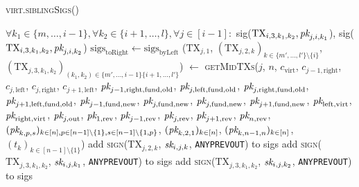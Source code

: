 \begin{center}
\begin{processbox}{\textsc{virt.siblingSigs}()}
\begin{algorithmic}[1]
      \Indent
        \State $\forall k_1 \in \{m, \dots, i-1\}, \forall k_2 \in \{i+1, \dots,
        l\}, \forall j \in [i-1]:$
        \Indent
          \State sig($\mathrm{TX}_{i, 3, k_1, k_2}, \textit{pk}_{j, i, k_1}$),
          sig($\mathrm{TX}_{i, 3, k_1, k_2}, \textit{pk}_{j, i, k_2}$)
        \EndIndent
      \EndIndent
      \State $\mathrm{sigs}_{\mathrm{toRight}} \gets
      \mathrm{sigs}_{\mathrm{byLeft}}$
      \Statex
        \State ($\mathrm{TX}_{j, 1}$, $(\mathrm{TX}_{j, 2, k})_{k \in \{m',
        \dots, l'\} \setminus \{i\}}$, $(\mathrm{TX}_{j, 3, k_1, k_2})_{(k_1,
        k_2) \in \{m', \dots, i-1\} \{i+1, \dots, l'\}}$) $\gets$
        \textsc{getMidTXs}($j$, $n$, $c_{\mathrm{virt}}$, $c_{j-1,
        \mathrm{right}}$, $c_{j, \mathrm{left}}$, $c_{j, \mathrm{right}}$,
        $c_{j+1, \mathrm{left}}$, $\textit{pk}_{j-1, \mathrm{right}, \mathrm{fund},
        \mathrm{old}}$, $\textit{pk}_{j, \mathrm{left}, \mathrm{fund}, \mathrm{old}}$,
        $\textit{pk}_{j, \mathrm{right}, \mathrm{fund}, \mathrm{old}}$, $\textit{pk}_{j+1,
        \mathrm{left}, \mathrm{fund}, \mathrm{old}}$, $\textit{pk}_{j-1, \mathrm{fund},
        \mathrm{new}}$, $\textit{pk}_{j, \mathrm{fund}, \mathrm{new}}$, $\textit{pk}_{j,
        \mathrm{fund}, \mathrm{new}}$, $\textit{pk}_{j+1, \mathrm{fund}, \mathrm{new}}$,
        $\textit{pk}_{\mathrm{left}, \mathrm{virt}}$, $\textit{pk}_{\mathrm{right},
        \mathrm{virt}}$, $\textit{pk}_{j, \mathrm{out}}$, $\textit{pk}_{1, \mathrm{rev}}$,
        $\textit{pk}_{j-1, \mathrm{rev}}$, $\textit{pk}_{j, \mathrm{rev}}$, $\textit{pk}_{j+1,
        \mathrm{rev}}$, $\textit{pk}_{n, \mathrm{rev}}$, $(\textit{pk}_{k, p, s})_{k \in [n], p
        \in [n-1] \setminus \{1\}, s \in [n-1] \setminus \{1, p\}}$, $(\textit{pk}_{k, 2,
        1})_{k \in [n]}$, $(\textit{pk}_{k, n-1, n})_{k \in [n]}$, $(t_k)_{k \in [n-1]
        \setminus \{1\}}$)
          \State add \textsc{sign}($\mathrm{TX}_{j, 2, k}$, $\textit{sk}_{i, j, k}$,
          \texttt{ANYPREVOUT}) to sigs
        \EndFor
          \State add \textsc{sign}($\mathrm{TX}_{j, 3, k_1, k_2}$, $\textit{sk}_{i, j,
          k_1}$, \texttt{ANYPREVOUT}) to sigs
          \State add \textsc{sign}($\mathrm{TX}_{j, 3, k_1, k_2}$, $\textit{sk}_{i, j,
          k_2}$, \texttt{ANYPREVOUT}) to sigs
        \EndFor
      \EndFor
       

\end{algorithmic}
\end{processbox}
\end{center}

